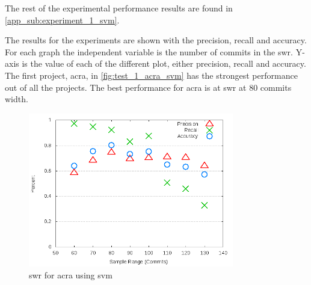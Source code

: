 The rest of the experimental performance results are found in \autoref{app_sub:experiment_1_svm}.

The results for the experiments are shown with the precision, recall and accuracy. For each graph the independent variable is the number of commits in the \gls{swr}. Y-axis is the value of each of the different plot, either precision, recall and accuracy. The first project, acra, in \autoref{fig:test_1_acra_svm} has the strongest performance out of all the projects. The best performance for acra is at \gls{swr} at 80 commits width. 



\begin{figure}[!ht]
    \centering

        \includegraphics[width=0.8\textwidth]{images/svm/test_1/acra_sample_range}
        \caption{\gls{swr} for acra using \gls{svm}}
        \label{fig:test_1_acra_svm}
\end{figure}

